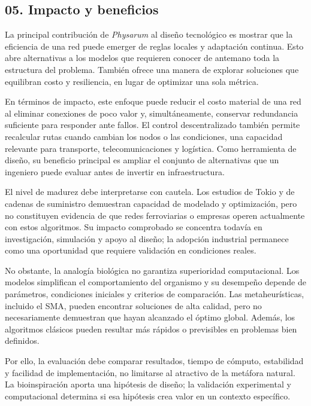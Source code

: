\documentclass[11pt,letterpaper]{article}
\begin{document}
\subsection*{05. Impacto y beneficios}

La principal contribución de \emph{Physarum} al diseño tecnológico es mostrar
que la eficiencia de una red puede emerger de reglas locales y adaptación
continua. Esto abre alternativas a los modelos que requieren conocer de
antemano toda la estructura del problema. También ofrece una manera de explorar
soluciones que equilibran costo y resiliencia, en lugar de optimizar una sola
métrica.

En términos de impacto, este enfoque puede reducir el costo material de una red
al eliminar conexiones de poco valor y, simultáneamente, conservar redundancia
suficiente para responder ante fallos. El control descentralizado también
permite recalcular rutas cuando cambian los nodos o las condiciones, una
capacidad relevante para transporte, telecomunicaciones y logística. Como
herramienta de diseño, su beneficio principal es ampliar el conjunto de
alternativas que un ingeniero puede evaluar antes de invertir en
infraestructura.

El nivel de madurez debe interpretarse con cautela. Los estudios de Tokio y de
cadenas de suministro demuestran capacidad de modelado y optimización, pero no
constituyen evidencia de que redes ferroviarias o empresas operen actualmente
con estos algoritmos. Su impacto comprobado se concentra todavía en
investigación, simulación y apoyo al diseño; la adopción industrial permanece
como una oportunidad que requiere validación en condiciones reales.

No obstante, la analogía biológica no garantiza superioridad computacional.
Los modelos simplifican el comportamiento del organismo y su desempeño depende
de parámetros, condiciones iniciales y criterios de comparación. Las
metaheurísticas, incluido el SMA, pueden encontrar soluciones de alta calidad,
pero no necesariamente demuestran que hayan alcanzado el óptimo global. Además,
los algoritmos clásicos pueden resultar más rápidos o previsibles en problemas
bien definidos.

Por ello, la evaluación debe comparar resultados, tiempo de cómputo,
estabilidad y facilidad de implementación, no limitarse al atractivo de la
metáfora natural. La bioinspiración aporta una hipótesis de diseño; la
validación experimental y computacional determina si esa hipótesis crea valor
en un contexto específico.
\end{document}
